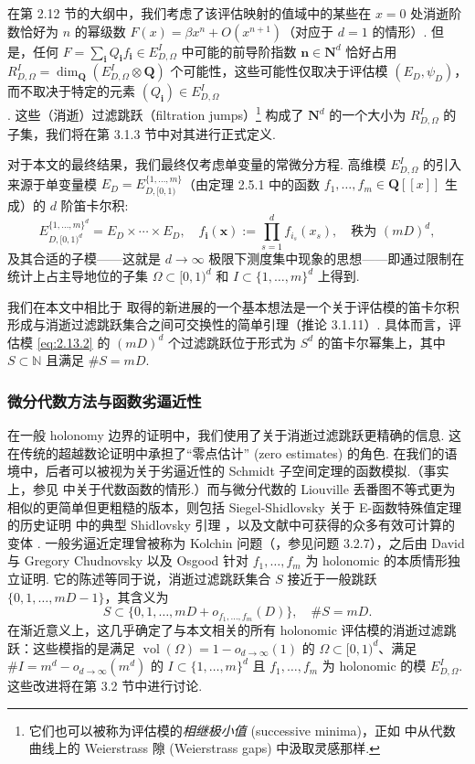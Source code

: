 在第 2.12 节的大纲中，我们考虑了该评估映射的值域中的某些在 $x=0$ 处消逝阶数恰好为 $n$ 的幂级数 $F(x) = \beta x^n + O(x^{n+1})$（对应于 $d=1$ 的情形）. 但是，任何 $F = \sum_{\mathbf{i}} Q_{\mathbf{i}} f_{\mathbf{i}} \in E_{D,\Omega}^I$ 中可能的前导阶指数 $\mathbf{n} \in \mathbf{N}^d$ 恰好占用 $R_{D,\Omega}^I = \dim_{\mathbf{Q}}(E_{D,\Omega}^I \otimes \mathbf{Q})$ 个可能性，这些可能性仅取决于评估模 $(E_D, \psi_D)$，而不取决于特定的元素 $(Q_{\mathbf{i}}) \in E_{D,\Omega}^I$. 这些（消逝）过滤跳跃（filtration jumps）\footnote{它们也可以被称为评估模的\emph{相继极小值} (successive minima)，正如 \cite{Ber99} 中从代数曲线上的 Weierstrass 隙 (Weierstrass gaps) 中汲取灵感那样.} 构成了 $\mathbf{N}^d$ 的一个大小为 $R_{D,\Omega}^I$ 的子集，我们将在第 3.1.3 节中对其进行正式定义.

对于本文的最终结果，我们最终仅考虑单变量的常微分方程. 高维模 $E_{D,\Omega}^I$ 的引入来源于单变量模 $E_D = E_{D,[0,1)}^{\{1,\ldots,m\}}$（由定理 2.5.1 中的函数 $f_1,\ldots,f_m \in \mathbf{Q}[\! [x]\!]$ 生成）的 $d$ 阶笛卡尔积:
\begin{equation}\label{eq:2.13.2}
E_{D,[0,1)^d}^{\{1,\ldots,m\}^d} = E_D \times \cdots \times E_D, \quad f_{\mathbf{i}}(\mathbf{x}) := \prod_{s=1}^d f_{i_s}(x_s), \quad \text{秩为 } (mD)^d,
\end{equation}
及其合适的子模——这就是 $d \to \infty$ 极限下测度集中现象的思想——即通过限制在统计上占主导地位的子集 $\Omega \subset [0,1)^d$ 和 $I \subset \{1,\ldots,m\}^d$ 上得到.

我们在本文中相比于 \cite[第 2 节]{CDT21} 取得的新进展的一个基本想法是一个关于评估模的笛卡尔积形成与消逝过滤跳跃集合之间可交换性的简单引理（推论 3.1.11）. 具体而言，评估模 \eqref{eq:2.13.2} 的 $(mD)^d$ 个过滤跳跃位于形式为 $S^d$ 的笛卡尔幂集上，其中 $S \subset \mathbb{N}$ 且满足 $\#S = mD$.

\subsubsection{微分代数方法与函数劣逼近性}\label{sec:2.13.3}
在一般 holonomy 边界的证明中，我们使用了关于消逝过滤跳跃更精确的信息. 这在传统的超越数论证明中承担了“零点估计” (zero estimates) 的角色. 在我们的语境中，后者可以被视为关于劣逼近性的 Schmidt 子空间定理的函数模拟.（事实上，参见 \cite{Wan04} 中关于代数函数的情形.）而与微分代数的 Liouville 丢番图不等式更为相似的更简单但更粗糙的版本，则包括 Siegel-Shidlovsky 关于 E-函数特殊值定理的历史证明 \cite{Shi59} 中的典型 Shidlovsky 引理 \cite[§ 3.5, Lemma 8]{Shi89}，以及文献中可获得的众多有效可计算的变体 \cite[第 11 节]{Chu80}\cite{BB85}\cite{BCY04}\cite[第 2 节]{Ber12}. 一般劣逼近定理曾被称为 Kolchin 问题（\cite{Kol59}，参见问题 3.2.7），之后由 David 与 Gregory Chudnovsky \cite{CC83} 以及 Osgood \cite{Osg85} 针对 $f_1, \dots, f_m$ 为 holonomic 的本质情形独立证明. 它的陈述等同于说，消逝过滤跳跃集合 $S$ 接近于一般跳跃 $\{0, 1, \dots, mD-1\}$，其含义为
\[ S \subset \{0, 1, \dots, mD + o_{f_1, \dots, f_m}(D)\}, \quad \#S = mD. \]
在渐近意义上，这几乎确定了与本文相关的所有 holonomic 评估模的消逝过滤跳跃：这些模指的是满足 $\operatorname{vol}(\Omega) = 1 - o_{d \to \infty}(1)$ 的 $\Omega \subset [0,1)^d$、满足 $\#I = m^d - o_{d \to \infty}(m^d)$ 的 $I \subset \{1,\ldots,m\}^d$ 且 $f_1,\ldots,f_m$ 为 holonomic 的模 $E_{D,\Omega}^I$. 这些改进将在第 3.2 节中进行讨论.

